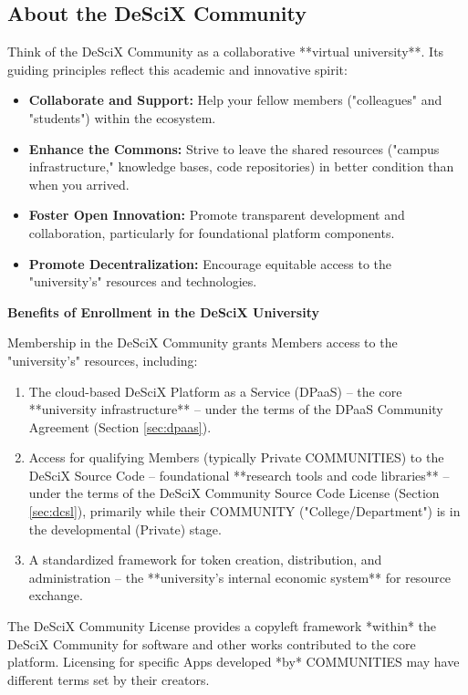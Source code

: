\documentclass{article}
\begin{document}
\subsection{About the DeSciX Community}

Think of the DeSciX Community as a collaborative **virtual university**. Its guiding principles reflect this academic and innovative spirit:

\begin{itemize}
    \item \textbf{Collaborate and Support:} Help your fellow members ("colleagues" and "students") within the ecosystem.
    \item \textbf{Enhance the Commons:} Strive to leave the shared resources ("campus infrastructure," knowledge bases, code repositories) in better condition than when you arrived.
    \item \textbf{Foster Open Innovation:} Promote transparent development and collaboration, particularly for foundational platform components.
    \item \textbf{Promote Decentralization:} Encourage equitable access to the "university's" resources and technologies.
\end{itemize}

\textbf{Benefits of Enrollment in the DeSciX University}

Membership in the DeSciX Community grants Members access to the "university's" resources, including:

\begin{enumerate}
    \item The cloud-based DeSciX Platform as a Service (DPaaS) – the core **university infrastructure** – under the terms of the DPaaS Community Agreement (Section \ref{sec:dpaas}).
    \item Access for qualifying Members (typically Private COMMUNITIES) to the DeSciX Source Code – foundational **research tools and code libraries** – under the terms of the DeSciX Community Source Code License (Section \ref{sec:dcsl}), primarily while their COMMUNITY ("College/Department") is in the developmental (Private) stage.
    \item A standardized framework for token creation, distribution, and administration – the **university's internal economic system** for resource exchange.
\end{enumerate}

The DeSciX Community License provides a copyleft framework *within* the DeSciX Community for software and other works contributed to the core platform. Licensing for specific Apps developed *by* COMMUNITIES may have different terms set by their creators.
\end{document}
